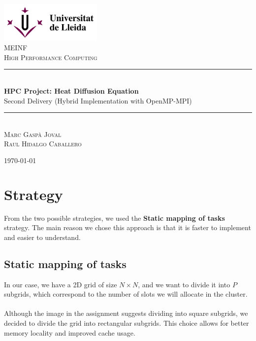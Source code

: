 \documentclass[12pt]{article}
\begin{document}
\begin{titlepage}
	\newcommand{\HRule}{\rule{\linewidth}{0.5mm}}

	\center

	\includegraphics[width=5cm]{logoudl.png}\\
	\textsc{\Large MEINF}\\[0.5cm]
	\textsc{\large High Performance Computing}\\[0.5cm]

	\HRule\\[0.4cm]

	{\huge\bfseries HPC Project: Heat Diffusion Equation}\\[0.4cm]
	{\LARGE Second Delivery (Hybrid Implementation with OpenMP-MPI)}
	\HRule\\[1.5cm]

	\textsc{Marc Gaspà Joval\\Raul Hidalgo Caballero}

	\vfill\vfill\vfill
	{\large\today}
\end{titlepage}
\pagebreak
\thispagestyle{empty}
\tableofcontents
\pagebreak
\thispagestyle{empty}
\listoftables
\pagebreak

\section{Strategy}
From the two possible strategies, we used the \textbf{Static mapping of tasks} strategy. The main reason we chose this approach is that it is faster to implement and easier to understand.

\subsection{Static mapping of tasks}
In our case, we have a 2D grid of	 size $N \times N$, and we want to divide it into $P$ subgrids, which correspond to the number of slots we will allocate in the cluster.
\\\\
Although the image in the assignment suggests dividing into square subgrids, we decided to divide the grid into rectangular subgrids. This choice allows for better memory locality and improved cache usage.
\end{document}
